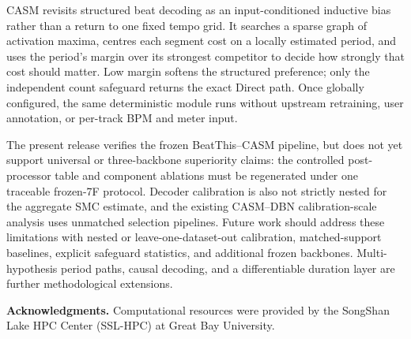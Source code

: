 \documentclass{article}
\begin{document}
CASM revisits structured beat decoding as an input-conditioned inductive bias rather than a return to one fixed tempo grid. It searches a sparse graph of activation maxima, centres each segment cost on a locally estimated period, and uses the period's margin over its strongest competitor to decide how strongly that cost should matter. Low margin softens the structured preference; only the independent count safeguard returns the exact Direct path. Once globally configured, the same deterministic module runs without upstream retraining, user annotation, or per-track BPM and meter input.

The present release verifies the frozen BeatThis--CASM pipeline, but does not yet support universal or three-backbone superiority claims: the controlled post-processor table and component ablations must be regenerated under one traceable frozen-7F protocol. Decoder calibration is also not strictly nested for the aggregate SMC estimate, and the existing CASM--DBN calibration-scale analysis uses unmatched selection pipelines. Future work should address these limitations with nested or leave-one-dataset-out calibration, matched-support baselines, explicit safeguard statistics, and additional frozen backbones. Multi-hypothesis period paths, causal decoding, and a differentiable duration layer are further methodological extensions.

\textbf{Acknowledgments.}
Computational resources were provided by the SongShan Lake HPC Center
(SSL-HPC) at Great Bay University.



\end{document}
